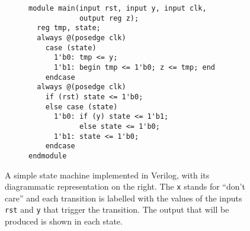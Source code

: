 \begin{figure}
  \centering
  \begin{subfigure}{0.55\linewidth}
\begin{verbatim}
module main(input rst, input y, input clk,
            output reg z);
  reg tmp, state;
  always @(posedge clk)
    case (state)
      1'b0: tmp <= y;
      1'b1: begin tmp <= 1'b0; z <= tmp; end
    endcase
  always @(posedge clk)
    if (rst) state <= 1'b0;
    else case (state)
      1'b0: if (y) state <= 1'b1;
            else state <= 1'b0;
      1'b1: state <= 1'b0;
    endcase
endmodule
\end{verbatim}
  \end{subfigure}\hfill%
  \begin{subfigure}{0.45\linewidth}
    \centering
  \end{subfigure}
  \caption[A simple Verilog implementation of a finite-state machine.]{A simple
    state machine implemented in Verilog, with its diagrammatic representation
    on the right. The \texttt{x} stands for \enquote{don't care} and each
    transition is labelled with the values of the inputs \texttt{rst} and
    \texttt{y} that trigger the transition.  The output that will be produced is
    shown in each state.}%
  \label{fig:tutorial:state_machine}
\end{figure}


